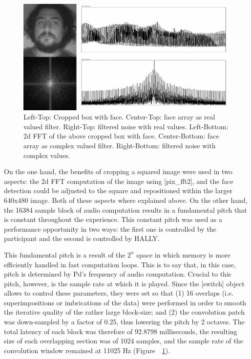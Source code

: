 \documentclass{nime-alternate}
\begin{document}
\begin{figure}
    \centering
        \includegraphics[width=1\linewidth]{non-and-fft}
    \caption{Left-Top: Cropped box with face. Center-Top: face array as real valued filter. Right-Top: filtered noise with real values. Left-Bottom: 2d FFT of the above cropped box with face. Center-Bottom: face array as complex valued filter. Right-Bottom: filtered noise with complex values.}
    \label{fig:non-and-fft}
\end{figure}

On the one hand, the benefits of cropping a squared image were used in two aspects: the 2d FFT computation of the image using [pix\_fft2], and the face detection could be adjusted to the square and repositioned within the larger 640x480 image. Both of these aspects where explained above. On the other hand, the 16384 sample block of audio computation results in a fundamental pitch that is constant throughout the experience. This constant pitch was used as a performance opportunity in two ways: the first one is controlled by the participant and the second is controlled by HALLY.  

This fundamental pitch is a result of the \(2^n\) space in which memory is more efficiently handled in fast computation loops. This is to say that, in this case, pitch is determined by Pd's frequency of audio computation. Crucial to this pitch, however, is the sample rate at which it is played. Since the [switch\ttt] object allows to control these parameters, they were set so that (1) 16 overlaps (i.e. superimpositions or imbrications of the data) were performed in order to smooth the iterative quality of the rather large block-size; and (2) the convolution patch was down-sampled by a factor of 0.25, thus lowering the pitch by 2 octaves. The total latency of each block was therefore of 92.8798 milliseconds, the resulting size of each overlapping section was of 1024 samples, and the sample rate of the convolution window remained at 11025 Hz (Figure~~\ref{fig:non-and-fft}). 
\end{document}

